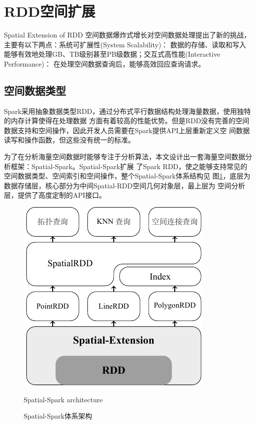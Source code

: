 \section{RDD空间扩展}{Spatial Extension of RDD}
空间数据爆炸式增长对空间数据处理提出了新的挑战，主要有以下两点：系统可扩展性(System Scalability)：
数据的存储、读取和写入能够有效地处理GB、TB级别甚至PB级数据；交互式高性能(Interactive Performance)：
在处理空间数据查询后，能够高效回应查询请求\cite{Yu2015GeoSpark}。

\subsection{空间数据类型}
Spark采用抽象数据类型RDD，通过分布式平行数据结构处理海量数据，使用独特的内存计算使得在处理数据
方面有着较高的性能优势。但是RDD没有完善的空间数据支持和空间操作，因此开发人员需要在Spark提供API上层重新定义空
间数据读写和操作函数，但这些没有统一的标准。

为了在分析海量空间数据时能够专注于分析算法，本文设计出一套海量空间数据分析框架：Spatial-Spark。Spatial-Spark扩展
了Spark RDD，使之能够支持常见的空间数据类型、空间索引和空间操作，整个Spatial-Spark体系结构见
图\ref{fig:spatialsparkarchitecture}，底层为数据存储层，核心部分为中间Spatial-RDD空间几何对象层，最上层为
空间分析层，提供了高度定制的API接口。
\begin{figure}
  \centering  
  \includegraphics{figures/spatialspark.pdf}\\
  \caption{Spatial-Spark体系架构}{Spatial-Spark architecture}
  \label{fig:spatialsparkarchitecture}
\end{figure}

